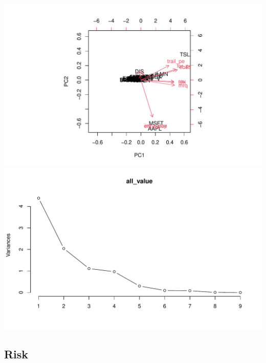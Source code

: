 \documentclass[11pt,a4paper,]{article}
\begin{document}
\includegraphics{ass2_files/figure-latex/unnamed-chunk-4-1.pdf} \includegraphics{ass2_files/figure-latex/unnamed-chunk-4-2.pdf}

\hypertarget{risk}{%
\subsection{Risk}\label{risk}}

\printbibliography[title=Introduction]
\end{document}
